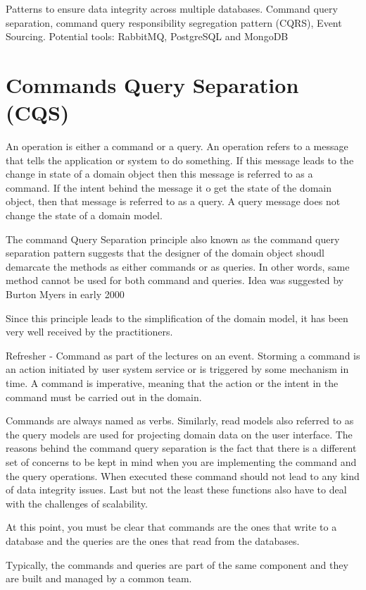 \documentclass[a4paper, 11pt]{book}
\begin{document}
    Patterns to ensure data integrity across multiple databases.
    Command query separation, command query responsibility segregation pattern (CQRS), Event Sourcing.
    Potential tools: RabbitMQ, PostgreSQL and MongoDB


    \section{Commands Query Separation (CQS)}
    An operation is either a command or a query.
    An operation refers to a message that tells the application or system to do something.
    If this message leads to the change in state of a domain object then this message is referred to as a command.
    If the intent behind the message it o get the state of the domain object, then that message is referred to as a query.
    A query message does not change the state of a domain model.

    The command Query Separation principle also known as the command query separation pattern suggests that the designer of the domain object shoudl demarcate the methods as either commands or as queries.
    In other words, same method cannot be used for both command and queries.
    Idea was suggested by Burton Myers in early 2000

    Since this principle leads to the simplification of the domain model, it has been very well received by the practitioners.

    Refresher - Command as part of the lectures on an event.
    Storming a command is an action initiated by user system service or is triggered by some mechanism in time.
    A command is imperative, meaning that the action or the intent in the command must be carried out in the domain.

    Commands are always named as verbs.
    Similarly, read models also referred to as the query models are used for projecting domain data on the user interface.
    The reasons behind the command query separation is the fact that there is a different set of concerns to be kept in mind when you are implementing the command and the query operations.
    When executed these command should not lead to any kind of data integrity issues.
    Last but not the least these functions also have to deal with the challenges of scalability.

    At this point, you must be clear that commands are the ones that write to a database and the queries are the ones that read from the databases.

    Typically, the commands and queries are part of the same component and they are built and managed by a common team.
\end{document}
